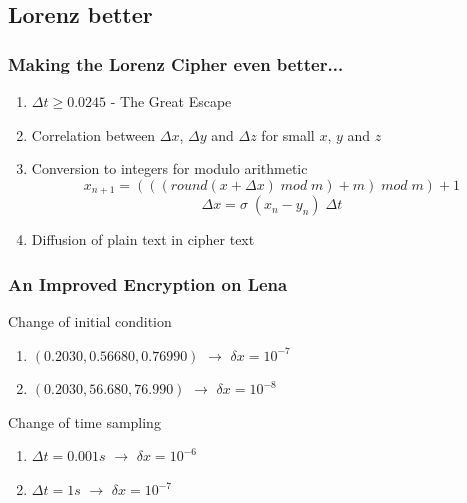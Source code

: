 \documentclass[xcolor=dvipsnames]{beamer}
\begin{document}
\subsection*{Lorenz better}
\begin{frame}
\frametitle{Making the Lorenz Cipher even better...}
\begin{enumerate}
\item
\alert{$\Delta t \geq 0.0245$} - The Great Escape
\newline
\item
Correlation between $\Delta x$, $\Delta y$ and $\Delta z$ for small $x$, $y$ and $z$
\newline
\item
Conversion to integers for \alert{modulo arithmetic}
\begin{equation*}
x_{n+1} = (((round (x + \Delta x)\;mod\;m )+m)\; mod\;m) + 1
\end{equation*}
\begin{equation*}
\Delta x = \sigma\;(x_n - y_n)\;\Delta t
\end{equation*}
\vspace{0.01in}
\item
\alert{Diffusion} of plain text in cipher text
\end{enumerate}
\end{frame}

\begin{frame}
\frametitle{An Improved Encryption on Lena}
\begin{block}{Change of initial condition}
\begin{enumerate}
\item
$(0.2030, 0.56680, 0.76990)$ $\rightarrow$ $\delta x = 10^{-7}$
\newline
\item
$(0.2030, 56.680, 76.990)$ $\rightarrow$ $\delta x = 10^{-8}$
\end{enumerate}
\end{block}
\vspace{0.2in}
\begin{block}{Change of time sampling}
\begin{enumerate}
\item
$\Delta t = 0.001 s$ $\rightarrow$ $\delta x = 10^{-6}$
\newline
\item
$\Delta t = 1 s$ $\rightarrow$ $\delta x = 10^{-7}$
\end{enumerate}
\end{block}
\end{frame}	
\end{document}
